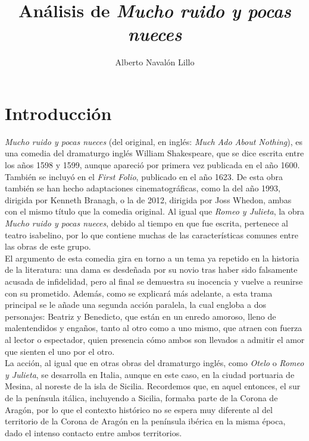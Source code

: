 \documentclass[12pt,a4paper]{article}
\title{\textbf{Análisis de \textit{Mucho ruido y pocas nueces}}}
\author{Alberto Navalón Lillo}
\begin{document}
\maketitle
\tableofcontents

\section{Introducción}

\textit{Mucho ruido y pocas nueces} (del original, en inglés: \textit{Much Ado About Nothing}), es una comedia del dramaturgo inglés William Shakespeare, que se dice escrita entre los años 1598 y 1599, aunque apareció por primera vez publicada en el año 1600. También se incluyó en el \textit{First Folio}, publicado en el año 1623. De esta obra también se han hecho adaptaciones cinematográficas, como la del año 1993, dirigida por Kenneth Branagh, o la de 2012, dirigida por Joss Whedon, ambas con el mismo título que la comedia original. Al igual que \textit{Romeo y Julieta}, la obra \textit{Mucho ruido y pocas nueces}, debido al tiempo en que fue escrita, pertenece al teatro isabelino, por lo que contiene muchas de las características comunes entre las obras de este grupo.\\

El argumento de esta comedia gira en torno a un tema ya repetido en la historia de la literatura: una dama es desdeñada por su novio tras haber sido falsamente acusada de infidelidad, pero al final se demuestra su inocencia y vuelve a reunirse con su prometido. Además, como se explicará más adelante, a esta trama principal se le añade una segunda acción paralela, la cual engloba a dos personajes: Beatriz y Benedicto, que están en un enredo amoroso, lleno de malentendidos y engaños, tanto al otro como a uno mismo, que atraen con fuerza al lector o espectador, quien presencia cómo ambos son llevados a admitir el amor que sienten el uno por el otro.\\

La acción, al igual que en otras obras del dramaturgo inglés, como \textit{Otelo} o \textit{Romeo y Julieta}, se desarrolla en Italia, aunque en este caso, en la ciudad portuaria de Mesina, al noreste de la isla de Sicilia. Recordemos que, en aquel entonces, el sur de la península itálica, incluyendo a Sicilia, formaba parte de la Corona de Aragón, por lo que el contexto histórico no se espera muy diferente al del territorio de la Corona de Aragón en la península ibérica en la misma época, dado el intenso contacto entre ambos territorios.
\end{document}
